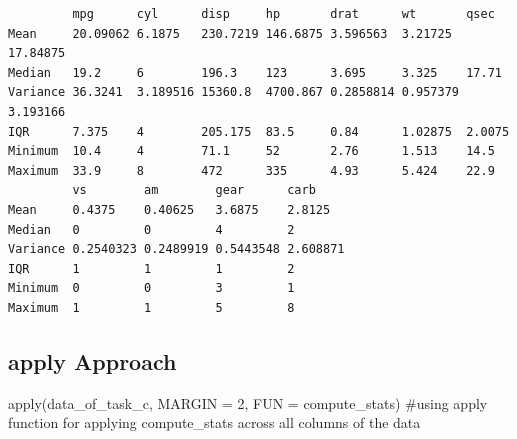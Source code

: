 \documentclass[
  letterpaper,
  DIV=11,
  numbers=noendperiod]{scrartcl}
\newenvironment{Shaded}{\begin{snugshade}}{\end{snugshade}}
\newcommand{\AttributeTok}[1]{\textcolor[rgb]{0.40,0.45,0.13}{#1}}
\newcommand{\CommentTok}[1]{\textcolor[rgb]{0.37,0.37,0.37}{#1}}
\newcommand{\DecValTok}[1]{\textcolor[rgb]{0.68,0.00,0.00}{#1}}
\newcommand{\FunctionTok}[1]{\textcolor[rgb]{0.28,0.35,0.67}{#1}}
\newcommand{\NormalTok}[1]{\textcolor[rgb]{0.00,0.23,0.31}{#1}}
\begin{document}
\begin{verbatim}
         mpg      cyl      disp     hp       drat      wt       qsec    
Mean     20.09062 6.1875   230.7219 146.6875 3.596563  3.21725  17.84875
Median   19.2     6        196.3    123      3.695     3.325    17.71   
Variance 36.3241  3.189516 15360.8  4700.867 0.2858814 0.957379 3.193166
IQR      7.375    4        205.175  83.5     0.84      1.02875  2.0075  
Minimum  10.4     4        71.1     52       2.76      1.513    14.5    
Maximum  33.9     8        472      335      4.93      5.424    22.9    
         vs        am        gear      carb    
Mean     0.4375    0.40625   3.6875    2.8125  
Median   0         0         4         2       
Variance 0.2540323 0.2489919 0.5443548 2.608871
IQR      1         1         1         2       
Minimum  0         0         3         1       
Maximum  1         1         5         8       
\end{verbatim}

\subsection{apply Approach}\label{apply-approach}

\begin{Shaded}
\begin{Highlighting}[]
\FunctionTok{apply}\NormalTok{(data\_of\_task\_c, }\AttributeTok{MARGIN =} \DecValTok{2}\NormalTok{, }\AttributeTok{FUN =}\NormalTok{ compute\_stats) }\CommentTok{\#using apply function for applying compute\_stats across all columns of the data}
\end{Highlighting}
\end{Shaded}
\end{document}
